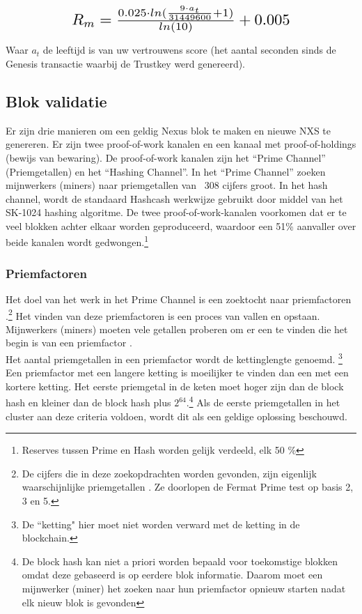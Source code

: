 \documentclass[11pt]{article}
\begin{document}
\paragraph{}
\begin{equation}
\resizebox{.65\hsize}{!}{$R_m = \frac{0.025 \cdot ln(\frac{9 \cdot a_{t}}{31449600} + 1)}{ln(10)} + 0.005$}
\end{equation}

\noindent Waar $a_t$ de leeftijd is van uw vertrouwens score (het aantal seconden sinds de Genesis transactie waarbij de Trustkey werd genereerd).

\subsection{Blok validatie}

Er zijn drie manieren om een ​​geldig Nexus blok te maken en nieuwe NXS te genereren. Er zijn twee proof-of-work kanalen en een kanaal met proof-of-holdings (bewijs van bewaring). De proof-of-work kanalen zijn het “Prime Channel” (Priemgetallen) en het “Hashing Channel”. In het “Prime Channel” zoeken mijnwerkers (miners) naar priemgetallen van ~308 cijfers groot.
In het hash channel, wordt de standaard Hashcash \cite{hashcash} werkwijze gebruikt door middel van het SK-1024 hashing algoritme. 
De twee proof-of-work-kanalen voorkomen dat er te veel blokken achter elkaar worden geproduceerd, waardoor een 51\% aanvaller over beide kanalen wordt gedwongen.\footnote{Reserves tussen Prime en Hash worden gelijk verdeeld, elk 50 \%}

\subsubsection{Priemfactoren}

Het doel van het werk in het Prime Channel is een zoektocht naar priemfactoren \cite{wikiprimecluster}.\footnote{De cijfers die in deze zoekopdrachten worden gevonden, zijn eigenlijk waarschijnlijke priemgetallen \cite{wikiprobable}. Ze doorlopen de Fermat Prime test \cite{wikifermat} op basis 2, 3 en 5.}
Het vinden van deze priemfactoren is een proces van vallen en opstaan. Mijnwerkers (miners) moeten vele getallen proberen om er een te vinden die het begin is van een priemfactor \cite{wolframprimecluster,primesolominer}.\\ 

\noindent Het aantal priemgetallen in een priemfactor wordt de kettinglengte genoemd.
\footnote{De ``ketting" hier moet niet worden verward met de ketting in de blockchain.}
Een priemfactor met een langere ketting is moeilijker te vinden dan een met een kortere ketting. Het eerste priemgetal in de keten moet hoger zijn dan de block hash en kleiner dan de block hash plus $2^{64}$.\footnote{De block hash kan niet a priori worden bepaald voor toekomstige blokken omdat deze gebaseerd is op eerdere blok informatie. Daarom moet een mijnwerker (miner) het zoeken naar hun priemfactor opnieuw starten nadat elk nieuw blok is gevonden}
Als de eerste priemgetallen in het cluster aan deze criteria voldoen, wordt dit als een geldige oplossing beschouwd.\\
\end{document}
